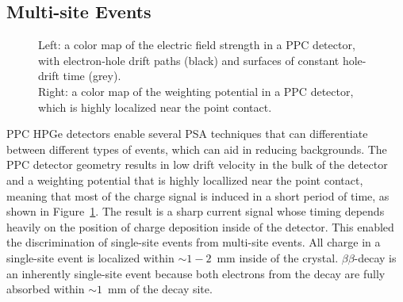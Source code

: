 \documentclass[/main.tex]{subfiles}
\begin{document}
\subsection{Multi-site Events} \label{sec:avse}
\begin{figure}[h]
  \centering
  \caption[Electric field model of a PPC detector]{\label{fig:ppcdet}
    Left: a color map of the electric field strength in a PPC detector, with electron-hole drift paths (black) and surfaces of constant hole-drift time (grey).\\
    Right: a color map of the weighting potential in a PPC detector, which is highly localized near the point contact.
  }
\end{figure}
PPC HPGe detectors enable several PSA techniques that can differentiate between different types of events, which can aid in reducing backgrounds.
The PPC detector geometry results in low drift velocity in the bulk of the detector and a weighting potential that is highly locallized near the point contact, meaning that most of the charge signal is induced in a short period of time, as shown in Figure~\ref{fig:ppcdet}.
The result is a sharp current signal whose timing depends heavily on the position of charge deposition inside of the detector.
This enabled the discrimination of single-site events from multi-site events.
All charge in a single-site event is localized within ${\sim}1-2$~mm inside of the crystal.
$\beta\beta$-decay is an inherently single-site event because both electrons from the decay are fully absorbed within ${\sim}1$~mm of the decay site.
\end{document}
